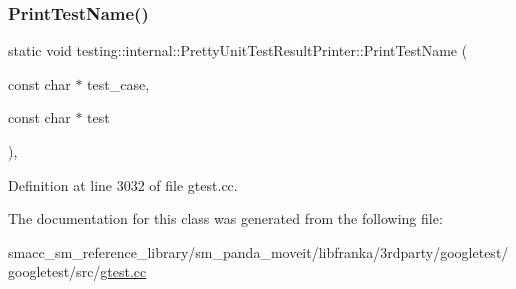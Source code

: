 \mbox{\label{classtesting_1_1internal_1_1PrettyUnitTestResultPrinter_a5b60a9aed1db02837b11450f6e8d0f71}} 
\subsubsection{\texorpdfstring{Print\+Test\+Name()}{PrintTestName()}}
{\footnotesize\ttfamily static void testing\+::internal\+::\+Pretty\+Unit\+Test\+Result\+Printer\+::\+Print\+Test\+Name (\begin{DoxyParamCaption}\item[{const char $\ast$}]{test\+\_\+case,  }\item[{const char $\ast$}]{test }\end{DoxyParamCaption})\hspace{0.3cm}{\ttfamily [inline]}, {\ttfamily [static]}}



Definition at line 3032 of file gtest.\+cc.




The documentation for this class was generated from the following file\+:\begin{DoxyCompactItemize}
\item 
smacc\+\_\+sm\+\_\+reference\+\_\+library/sm\+\_\+panda\+\_\+moveit/libfranka/3rdparty/googletest/googletest/src/\hyperlink{gtest_8cc}{gtest.\+cc}\end{DoxyCompactItemize}
